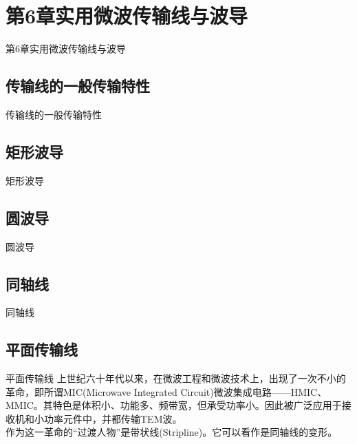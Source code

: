 \section{第6章\quad 实用微波传输线与波导}
\begin{frame}{第6章\quad 实用微波传输线与波导}

\end{frame}

\subsection{传输线的一般传输特性}
\begin{frame}{传输线的一般传输特性}

\end{frame}

\subsection{矩形波导}
\begin{frame}{矩形波导}

\end{frame}

\subsection{圆波导}
\begin{frame}{圆波导}

\end{frame}

\subsection{同轴线}
\begin{frame}{同轴线}

\end{frame}

\subsection{平面传输线}
\begin{frame}{平面传输线}
    上世纪六十年代以来，在微波工程和微波技术上，出现了一次不小的革命，即所谓MIC(Microwave Integrated Circuit)微波集成电路——HMIC、MMIC。其特色是体积小、功能多、频带宽，但承受功率小。因此被广泛应用于接收机和小功率元件中，并都传输TEM波。\\
    作为这一革命的“过渡人物”是带状线(Stripline)。它可以看作是同轴线的变形。
\end{frame}






